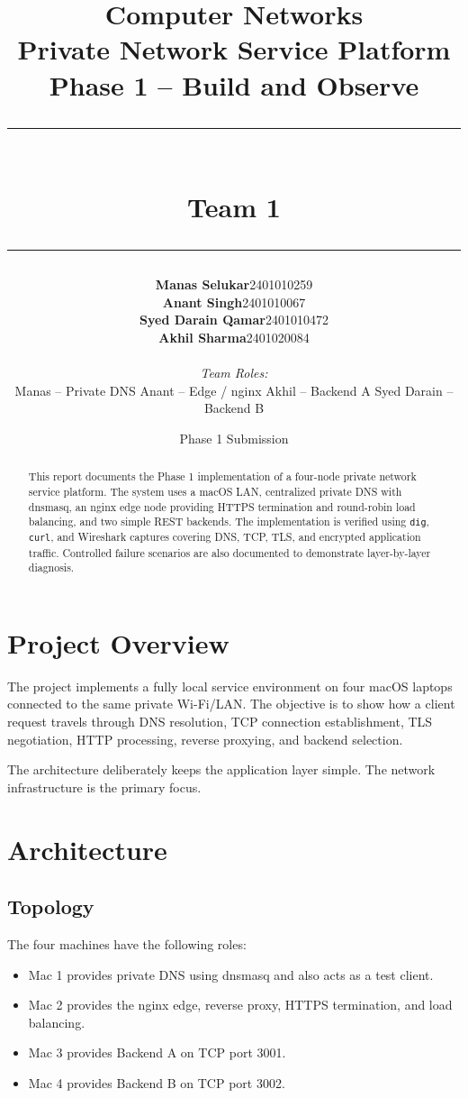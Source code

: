 \documentclass[11pt,a4paper]{article}
\title{
    \vspace{2cm}
    {\LARGE\bfseries Computer Networks}\\[0.4cm]
    {\Large Private Network Service Platform}\\[0.7cm]
    {\large Phase 1 -- Build and Observe}\\[1.5cm]
    \rule{\textwidth}{0.5pt}\\[0.4cm]
    \large Team 1
    \rule{\textwidth}{0.5pt}
}
\author{
    \begin{tabular}{ll}
    \textbf{Manas Selukar} & 2401010259 \\
    \textbf{Anant Singh} & 2401010067 \\
    \textbf{Syed Darain Qamar} & 2401010472 \\
    \textbf{Akhil Sharma} & 2401020084
    \end{tabular}
    \\[0.6cm]
    \textit{Team Roles:}\\
    Manas -- Private DNS \quad
    Anant -- Edge / nginx \quad
    Akhil -- Backend A \quad
    Syed Darain -- Backend B
}
\date{Phase 1 Submission}
\begin{document}
\maketitle
\thispagestyle{empty}

\begin{abstract}
This report documents the Phase 1 implementation of a four-node private
network service platform. The system uses a macOS LAN, centralized private
DNS with dnsmasq, an nginx edge node providing HTTPS termination and
round-robin load balancing, and two simple REST backends. The implementation
is verified using \texttt{dig}, \texttt{curl}, and Wireshark captures covering
DNS, TCP, TLS, and encrypted application traffic. Controlled failure
scenarios are also documented to demonstrate layer-by-layer diagnosis.
\end{abstract}

\tableofcontents
\newpage

\section{Project Overview}

The project implements a fully local service environment on four macOS
laptops connected to the same private Wi-Fi/LAN. The objective is to show
how a client request travels through DNS resolution, TCP connection
establishment, TLS negotiation, HTTP processing, reverse proxying, and
backend selection.

The architecture deliberately keeps the application layer simple. The
network infrastructure is the primary focus.

\section{Architecture}

\subsection{Topology}

The four machines have the following roles:

\begin{itemize}[leftmargin=*]
    \item Mac 1 provides private DNS using dnsmasq and also acts as a test client.
    \item Mac 2 provides the nginx edge, reverse proxy, HTTPS termination, and load balancing.
    \item Mac 3 provides Backend A on TCP port 3001.
    \item Mac 4 provides Backend B on TCP port 3002.
\end{itemize}
\end{document}
